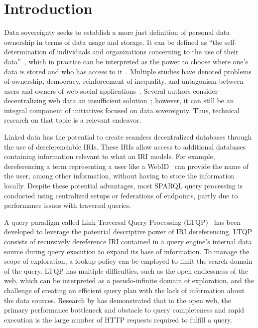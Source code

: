 \section{Introduction}

Data sovereignty seeks to establish a more just definition of personal data ownership in terms of data usage and storage.
It can be defined as ``the self-determination of individuals and organizations concerning to the use of their data''~\cite{verstraete2022solid},
which in practice can be interpreted as the power to choose where one's data is stored and who has access to it~\cite{verstraete2022solid}.
Multiple studies have denoted problems of ownership, democracy, reinforcement of inequality, and antagonism between users and owners of web social applications~\cite{Terranova2000FreeLP, Curran2016ch1, Sevignani2013, 9663788}.
Several authors consider decentralizing web data an insufficient solution~\cite{9663788, Curran2016ch1}; however, it can still be an integral component of initiatives focused on data sovereignty.
Thus, technical research on that topic is a relevant endeavor.

Linked data has the potential to create seamless decentralized databases through the use of dereferenciable IRIs.
These IRIs allow access to additional databases containing information relevant to what an IRI models.
For example, dereferencing a term representing a user like a WebID~ can provide the name of the user, among other information, without having 
to store the information locally.
Despite these potential advantages, most SPARQL query processing is conducted using centralized setups or federations of endpoints, partly due to performance issues with traversal queries.

A query paradigm called Link Traversal Query Processing (LTQP)~\cite{Hartig2012} has been developed to leverage the potential descriptive power of IRI dereferencing.
LTQP consists of recursively dereference IRI contained in a query engine's internal data source during query execution to expand its base of information.
To manage the scope of exploration, a lookup policy can be employed to limit the search domain of the query.
LTQP has multiple difficulties, such as the open endlessness of the web, which can be interpreted as a pseudo-infinite domain of exploration,
and the challenge of creating an efficient query plan with the lack of information about the data sources. 
Research by \citeauthor{hartig2016walking} has demonstrated that in the open web, the primary performance bottleneck and obstacle to query completeness and rapid execution is the large number of HTTP requests required to fulfill a query.

